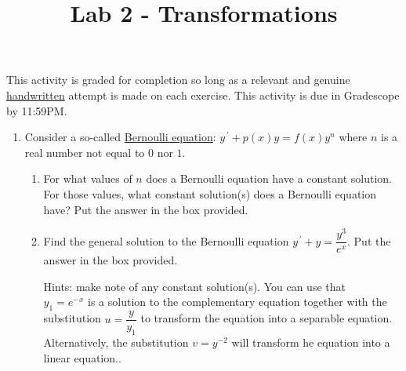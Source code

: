 \documentclass{ximera}
\begin{document}
\begin{abstract}
 \end{abstract}

    \title{Lab 2 - Transformations}
    
    \maketitle

This activity is graded for completion so long as a relevant and genuine \underline{handwritten} attempt is made on each exercise.  This activity is due in Gradescope by 11:59PM.


\begin{enumerate}

\item  Consider a so-called \underline{Bernoulli equation}: $y^{\,\prime}+p(x)y=f(x)y^{n}$ where $n$ is a real number not equal to $0$ nor $1$.



\begin{enumerate}

\item  For what values of $n$ does a Bernoulli equation have a constant solution.  For those values, what constant solution(s) does a Bernoulli equation have?  Put the answer in the box provided.

\hfill{}\fbox{ \begin{minipage}{3in}\vspace{0.25in} \hfill\vspace{0.25in} \end{minipage} }


\item  Find the general solution to the Bernoulli equation $y^{\,\prime}+y=\dfrac{y^3}{e^{x}}$.  Put the answer in the box provided.
    
    Hints: make note of any constant solution(s).  You can use that\\ $y_1=e^{-x}$ is a solution to the complementary equation together with the substitution $u=\dfrac{y}{y_1}$ to transform the equation into a separable equation.  Alternatively, the substitution $v=y^{-2}$ will transform he equation into a linear equation..
    
    
    
    
    

\end{enumerate}
\end{enumerate}
\end{document}
